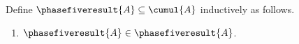 \begin{inductive}\label{phase5_recursive_result}
    Define $\phasefiveresult{A}\subseteq\cumul{A}$ inductively as follows.
    \begin{enumerate}
        \item $\phasefiveresult{A}\in\phasefiveresult{A}$.
    \end{enumerate}
\end{inductive}
